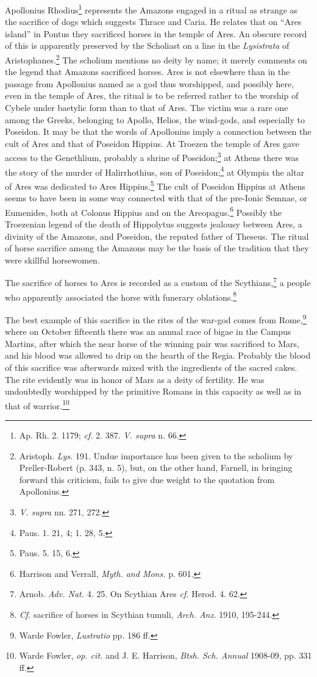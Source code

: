 \documentclass[a4paper, 12pt, oneside]{article}
\begin{document}
Apollonius Rhodius\footnote{Ap. Rh. 2. 1179; \emph{cf.} 2. 387. \emph{V. supra} n. 66.} represents the Amazons engaged in a ritual as strange as the sacrifice of dogs which suggests Thrace and Caria. He relates that on ``Ares island'' in Pontus they sacrificed horses in the temple of Ares. An obscure record of this is apparently preserved by the Scholiast on a line in the \emph{Lysistrata} of Aristophanes.\footnote{Aristoph. \emph{Lys.} 191. Undue importance has been given to the scholium by Preller-Robert (p. 343, n. 5), but, on the other hand, Farnell, in bringing forward this criticism, fails to give due weight to the quotation from Apollonius.} The scholium mentions no deity by name; it merely comments on the legend that Amazons sacrificed horses. Ares is not elsewhere than in the passage from Apollonius named as a god thus worshipped, and possibly here, even in the temple of Ares, the ritual is to be referred rather to the worship of Cybele under baetylic form than to that of Ares. The victim was a rare one among the Greeks, belonging to Apollo, Helios, the wind-gods, and especially to Poseidon. It may be that the words of Apollonius imply a connection between the cult of Ares and that of Poseidon Hippius. At Troezen the temple of Ares gave access to the Genethlium, probably a shrine of Poseidon;\footnote{\emph{V. supra} nn. 271, 272.} at Athens there was the story of the murder of Halirrhothius, son of Poseidon;\footnote{Paus. 1. 21, 4; 1. 28, 5.} at Olympia the altar of Ares was dedicated to Ares Hippius.\footnote{Paus. 5. 15, 6.} The cult of Poseidon Hippius at Athens seems to have been in some way connected with that of the pre-Ionic Semnae, or Eumenides, both at Colonus Hippius and on the Areopagus.\footnote{Harrison and Verrall, \emph{Myth. and Mons.} p. 601.} Possibly the Troezenian legend of the death of Hippolytus suggests jealousy between Ares, a divinity of the Amazons, and Poseidon, the reputed father of Theseus. The ritual of horse sacrifice among the Amazons may be the basis of the tradition that they were skillful horsewomen.

The sacrifice of horses to Ares is recorded as a custom of the Scythians,\footnote{Arnob. \emph{Adv. Nat.} 4. 25. On Scythian Ares \emph{cf.} Herod. 4. 62.} a people who apparently associated the horse with funerary oblations.\footnote{\emph{Cf.} sacrifice of horses in Scythian tumuli, \emph{Arch. Anz.} 1910, 195-244.}

The best example of this sacrifice in the rites of the war-god comes from Rome,\footnote{Warde Fowler, \emph{Lustratio} pp. 186 ff.} where on October fifteenth there was an annual race of bigae in the Campus Martins, after which the near horse of the winning pair was sacrificed to Mars, and his blood was allowed to drip on the hearth of the Regia. Probably the blood of this sacrifice was afterwards mixed with the ingredients of the sacred cakes. The rite evidently was in honor of Mars as a deity of fertility. He was undoubtedly worshipped by the primitive Romans in this capacity as well as in that of warrior.\footnote{Warde Fowler, \emph{op. cit.} and J. E. Harrison, \emph{Btsh. Sch. Annual} 1908-09, pp. 331 ff.}
\end{document}

